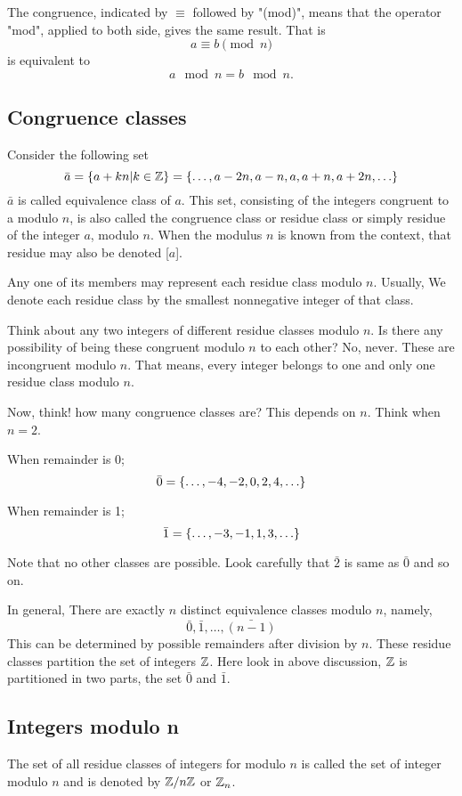 The congruence, indicated by $\equiv$ followed by "(mod)", means that the operator "mod", applied to both side, gives the same result. That is
\[ a\equiv b{\pmod {n}}\]
is equivalent to
\[a\mod{n}=b \mod{n}.\]
\subsection{Congruence classes}
Consider the following set
\[\bar{a} = \left\{a+kn | k \in \mathbb Z\right\} = \left\{\ldots,a-2n, a-n, a, a+n, a+2n,\ldots\right\}\]
$\bar{a}$ is called equivalence class of $a$. This set, consisting of the integers congruent to a modulo $n$, is also called the congruence class or residue class or simply residue of the integer $a$, modulo $n$. When the modulus $n$ is known from the context, that residue may also be denoted [$a$].

Any one of its members may represent each residue class modulo $n$. Usually, We denote each residue class by the smallest nonnegative integer of that class.

Think about any two integers of different residue classes modulo $n$. Is there any possibility of being these congruent modulo $n$ to each other? No, never. These are incongruent modulo $n$. That means, every integer belongs to one and only one residue class modulo $n$.

Now, think! how many congruence classes are? This depends on $n$. Think when $n=2$.

When remainder is 0;
\[ \bar{0} = \left\{\ldots, -4, -2, 0, 2, 4, \ldots\right\}\]

When remainder is 1;
\[ \bar{1} = \left\{\ldots, -3, -1, 1, 3, \ldots\right\}\]

Note that no other classes are possible. Look carefully that $\bar{2}$ is same as $\bar{0}$ and so on.

In general, There are exactly $n$ distinct equivalence classes modulo $n$, namely,
\[\bar{0}, \bar{1}, \ldots, \bar{(n-1)}\] 
This can be determined by possible remainders after division by $n$. These residue classes partition the set of integers $\mathbb Z$. Here look in above discussion, $\mathbb Z$ is partitioned in two parts, the set $\bar{0}$ and $\bar{1}$.
\subsection{Integers modulo n}
\begin{defn}
	The set of all residue classes of integers for modulo $n$ is called the set of integer modulo $n$ and is denoted by $\mathbb Z/n\mathbb Z$ or $\mathbb Z_n$.
\end{defn}

